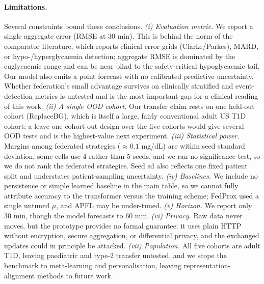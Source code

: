 \documentclass[10pt,letterpaper]{article}
\begin{document}
\paragraph{Limitations.} Several constraints bound these conclusions. \emph{(i)
Evaluation metric.} We report a single aggregate error (RMSE at 30 min). This is
behind the norm of the comparator literature, which reports clinical error grids
(Clarke/Parkes), MARD, or hypo-/hyperglycaemia detection; aggregate RMSE is
dominated by the euglycaemic range and can be near-blind to the safety-critical
hypoglycaemic tail. Our model also emits a point forecast with no calibrated
predictive uncertainty. Whether federation's small advantage survives on
clinically stratified and event-detection metrics is untested and is the most
important gap for a clinical reading of this work. \emph{(ii) A single OOD cohort.}
Our transfer claim rests on one held-out cohort (ReplaceBG), which is itself a
large, fairly conventional adult US T1D cohort; a leave-one-cohort-out design
over the five cohorts would give several OOD tests and is the highest-value next
experiment. \emph{(iii) Statistical power.} Margins among federated strategies
($\approx 0.1$ mg/dL) are within seed standard deviation, some cells use 4 rather
than 5 seeds, and we ran no significance test, so we do not rank the federated
strategies. Seed sd also reflects one fixed patient split and understates
patient-sampling uncertainty. \emph{(iv) Baselines.} We include no persistence or
simple learned baseline in the main table, so we cannot fully attribute accuracy
to the transformer versus the training scheme; FedProx used a single untuned
$\mu$, and APFL may be under-tuned. \emph{(v) Horizon.} We report only 30 min,
though the model forecasts to 60 min. \emph{(vi) Privacy.} Raw data never moves,
but the prototype provides no formal guarantee: it uses plain HTTP without
encryption, secure aggregation, or differential privacy, and the exchanged
updates could in principle be attacked. \emph{(vii) Population.} All five cohorts
are adult T1D, leaving paediatric and type-2 transfer untested, and we scope the
benchmark to meta-learning and personalisation, leaving representation-alignment
methods to future work.
\end{document}
